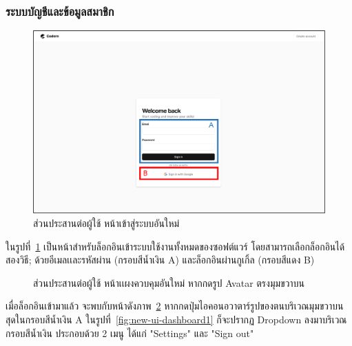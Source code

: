 \documentclass[12pt,one side,openright,a4paper]{cpe-thesis-th}
\newcommand{\thaijustify}[1]{%
  \par\hspace{30pt}\justifying
  #1
}
\begin{document}
\subsubsection{ระบบบัญชีและข้อมูลสมาชิก}
\begin{figure}[H]
  \centering
  \includegraphics[width=15cm]{figure/new-ui/ui-login1.png}
  \caption[ส่วนประสานต่อผู้ใช้ หน้าเข้าสู่ระบบใหม่]{ส่วนประสานต่อผู้ใช้ หน้าเข้าสู่ระบบอันใหม่}\label{fig:new-ui-login}
\end{figure}
\thaijustify{
  ในรูปที่~\ref{fig:new-ui-login} เป็นหน้าสำหรับล็อกอินเข้าระบบใช้งานทั้งหมดของซอฟต์แวร์ โดยสามารถเลือกล็อกอินได้สองวิธี; ด้วยอีเมลเเละรหัสผ่าน (กรอบสีน้ำเงิน A) และล็อกอินผ่านกูเกิ้ล (กรอบสีแดง B)
}
\begin{figure}[H]
  \centering
  \caption[ส่วนประสานต่อผู้ใช้ หน้าเเผงควบคุมใหม่ (กดรูป Avatar)]{ส่วนประสานต่อผู้ใช้ หน้าเเผงควบคุมอันใหม่ หากกดรูป Avatar ตรงมุมขวาบน}
  \label{fig:new-ui-dashboard5}
\end{figure}
\thaijustify{
  เมื่อล็อกอินเข้ามาแล้ว จะพบกับหน้าดังภาพ~\ref{fig:new-ui-dashboard5} หากกดปุ่มไอคอนอวาตาร์รูปของตนบริเวณมุมขวาบนสุดในกรอบสีน้ำเงิน A ในรูปที่~\ref{fig:new-ui-dashboard1} ก็จะปรากฏ Dropdown ลงมาบริเวณกรอบสีน้ำเงิน ประกอบด้วย 2 เมนู ได้แก่ "Settings" และ "Sign out"
}
\end{document}
